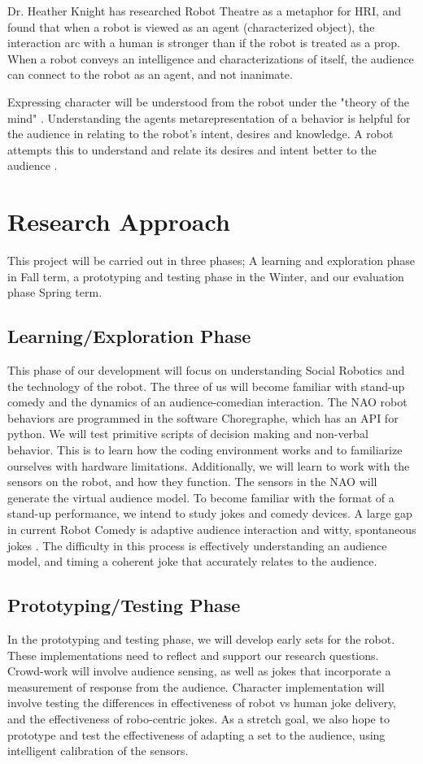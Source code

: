 \documentclass[onecolumn, draftclsnofoot,10pt, compsoc]{IEEEtran}
\begin{document}
Dr. Heather Knight has researched Robot Theatre as a metaphor for HRI, and found that when a robot is viewed as an agent (characterized object), the interaction arc with a human is stronger than if the robot is treated as a prop. When a robot conveys an intelligence and characterizations of itself, the audience can connect to the robot as an agent, and not inanimate.

Expressing character will be understood from the robot under the "theory of the mind" \cite{leslie}. Understanding the agents metarepresentation of a behavior is helpful for the audience in relating to the robot's intent, desires and knowledge. A robot attempts this to understand and relate its desires and intent better to the audience \cite{theoryOfMindRobots}.

\section{Research Approach}
This project will be carried out in three phases; A learning and exploration phase in Fall term, a prototyping and testing phase in the Winter, and our evaluation phase Spring term.

\subsection{Learning/Exploration Phase}
This phase of our development will focus on understanding Social Robotics and the technology of the robot. The three of us will become familiar with stand-up comedy and the dynamics of an audience-comedian interaction. The NAO robot behaviors are programmed in the software Choregraphe, which has an API for python. We will test primitive scripts of decision making and non-verbal behavior. This is to learn how the coding environment works and to familiarize ourselves with hardware limitations. Additionally, we will learn to work with the sensors on the robot, and how they function. The sensors in the NAO will generate the virtual audience model. To become familiar with the format of a stand-up performance, we intend to study jokes and comedy devices. A large gap in current Robot Comedy is adaptive audience interaction and witty, spontaneous jokes \cite{KatevasRobot:2014}. The difficulty in this process is effectively understanding an audience model, and timing a coherent joke that accurately relates to the audience.

\subsection{Prototyping/Testing Phase}
In the prototyping and testing phase, we will develop early sets for the robot. These implementations need to reflect and support our research questions. Crowd-work will involve audience sensing, as well as jokes that incorporate a measurement of response from the audience. Character implementation will involve testing the differences in effectiveness of robot vs human joke delivery, and the effectiveness of robo-centric jokes. As a stretch goal, we also hope to prototype and test the effectiveness of adapting a set to the audience, using intelligent calibration of the sensors.
\end{document}
